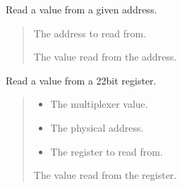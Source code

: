 \documentclass[letterpaper,10pt,english]{sphinxmanual}
\begin{document}
\begin{fulllineitems}
\label{\detokenize{cplddocs:phy_marvell_88X2222_init.rd}}
\pysigstartsignatures
{}
\pysigstopsignatures
\sphinxAtStartPar
Read a value from a given address.
\begin{quote}\begin{description}
\sphinxAtStartPar
{} \textendash{} The address to read from.

\sphinxAtStartPar
The value read from the address.

\end{description}\end{quote}

\end{fulllineitems}


\begin{fulllineitems}
\label{\detokenize{cplddocs:phy_marvell_88X2222_init.read22}}
\pysigstartsignatures
{}
\pysigstopsignatures
\sphinxAtStartPar
Read a value from a 22\sphinxhyphen{}bit register.
\begin{quote}\begin{description}
\begin{itemize}
\item {} 
\sphinxAtStartPar
{} \textendash{} The multiplexer value.

\item {} 
\sphinxAtStartPar
{} \textendash{} The physical address.

\item {} 
\sphinxAtStartPar
{} \textendash{} The register to read from.

\end{itemize}

\sphinxAtStartPar
The value read from the register.

\end{description}\end{quote}

\end{fulllineitems}
\end{document}

